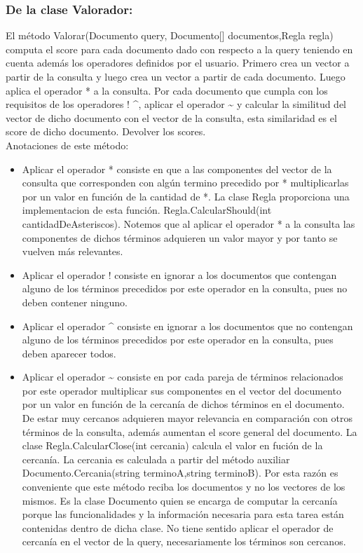 \documentclass{article}
\begin{document}
\subsubsection{De la clase Valorador:}
El método Valorar(Documento query, Documento[] documentos,Regla regla) computa el score para cada documento dado con respecto a la query teniendo en cuenta además los operadores definidos por el usuario. Primero crea un vector a partir de la consulta y luego crea un vector a partir de cada documento. Luego aplica el operador * a la consulta. Por cada documento que cumpla con los requisitos de los operadores ! \^{}, aplicar el operador \~{} y calcular la similitud del vector de dicho documento con el vector de la consulta, esta similaridad es el score de dicho documento. Devolver los scores.\\
Anotaciones de este método:
\begin{itemize}
  \item Aplicar el operador * consiste en que a las componentes del vector de la consulta que corresponden con algún termino precedido por * multiplicarlas por un valor en función de la cantidad de *. La clase Regla proporciona una implementacion de esta función. Regla.CalcularShould(int cantidadDeAsteriscos). Notemos que al aplicar el operador * a la consulta   las componentes de dichos términos adquieren un valor mayor y por tanto se vuelven más relevantes.
  \item Aplicar el operador ! consiste en ignorar a los documentos que contengan alguno de los términos precedidos por este operador en la consulta, pues no deben contener ninguno.
  \item Aplicar el operador \^{} consiste en ignorar a los documentos que no contengan alguno de los términos precedidos por este operador en la consulta, pues deben aparecer todos.
  \item Aplicar el operador \~{} consiste en por cada pareja de términos relacionados por este operador multiplicar sus componentes en el vector del documento por un valor en función de la cercanía de dichos términos en el documento. De estar muy cercanos adquieren mayor relevancia en comparación con otros términos de la consulta, además aumentan el score general del documento. La clase Regla.CalcularClose(int cercania) calcula el valor en fución de la cercanía. La cercania es calculada a partir del método auxiliar Documento.Cercania(string terminoA,string terminoB). Por esta razón es conveniente que este método reciba los documentos y no los vectores de los mismos. Es la clase Documento quien se encarga de computar la cercanía porque las funcionalidades y la información necesaria para esta tarea están contenidas dentro de dicha clase. No tiene sentido aplicar el operador de cercanía en el vector de la query, necesariamente los términos son cercanos.
\end{itemize}
\end{document}
